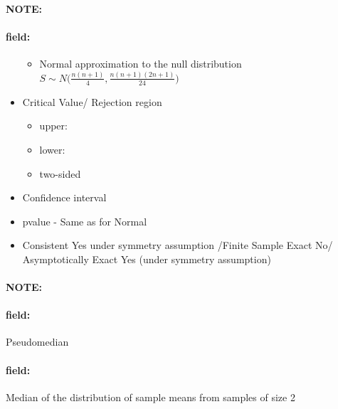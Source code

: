 \documentclass[12pt]{article}
\newenvironment{note}{\paragraph{NOTE:}}{}
\newenvironment{field}{\paragraph{field:}}{}
\begin{document}
\begin{note}
\begin{field}
\begin{itemize}
\begin{itemize}
         \item Normal approximation to the null distribution $S \sim N\big(\frac{n(n+1)}{4}, \frac{n(n+1)(2n+1)}{24}\big)$
       \end{itemize}
      \item Critical Value/ Rejection region
            \begin{itemize}
              \item upper:
              \item lower:
              \item two-sided
            \end{itemize}
      \item Confidence interval
      \item pvalue - Same as for Normal
      \item Consistent Yes under symmetry assumption /Finite Sample Exact No/ Asymptotically Exact Yes (under symmetry assumption)
    \end{itemize}
  \end{field}
\end{note}

\begin{note}
  \begin{field}
    Pseudomedian
  \end{field}
  \begin{field}
    Median of the distribution of sample means from samples of size 2
  \end{field}
\end{note}
\end{document}
